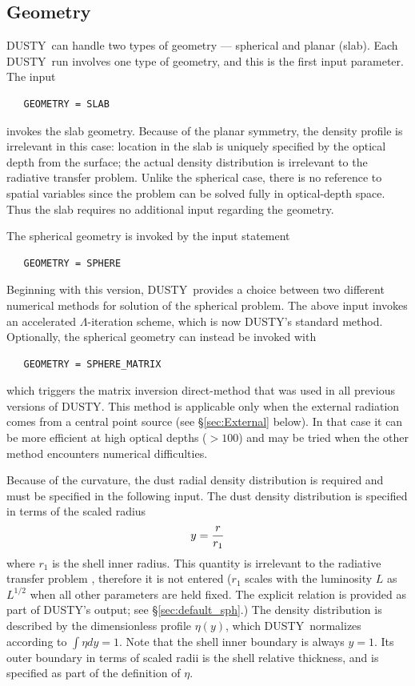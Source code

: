 \documentclass[11pt]{article}
\def\D    {{\sf DUSTY}}
\begin{document}
\subsection{Geometry}
\label{geometry}

\D\ can handle two types of geometry --- spherical and planar
(slab). Each \D\ run involves one type of geometry, and this is the
first input parameter. The input
\begin{verbatim}
   GEOMETRY = SLAB
\end{verbatim}
invokes the slab geometry. Because of the planar symmetry, the density
profile is irrelevant in this case: location in the slab is uniquely
specified by the optical depth from the surface; the actual density
distribution is irrelevant to the radiative transfer problem. Unlike
the spherical case, there is no reference to spatial variables since
the problem can be solved fully in optical-depth space. Thus the slab
requires no additional input regarding the geometry.

\medskip

The spherical geometry is invoked by the input statement
\begin{verbatim}
   GEOMETRY = SPHERE
\end{verbatim}
Beginning with this version, \D\ provides a choice between two
different numerical methods for solution of the spherical problem. The
above input invokes an accelerated $\Lambda$-iteration scheme, which
is now \D's standard method. Optionally, the spherical geometry can
instead be invoked with
\begin{verbatim}
   GEOMETRY = SPHERE_MATRIX
\end{verbatim}
which triggers the matrix inversion direct-method \cite{Schmid} that
was used in all previous versions of \D. This method is applicable
only when the external radiation comes from a central point source
(see \S\ref{sec:External} below). In that case it can be more
efficient at high optical depths ($> 100$) and may be tried when the
other method encounters numerical difficulties.

Because of the curvature, the dust radial density distribution is
required and must be specified in the following input. The dust
density distribution is specified in terms of the scaled radius
\[
y = {r \over r_1}
\]
where $r_1$ is the shell inner radius.  This quantity is irrelevant to
the radiative transfer problem \cite{IE97}, therefore it is not
entered ($r_1$ scales with the luminosity $L$ as $L^{1/2}$ when all
other parameters are held fixed. The explicit relation is provided as
part of \D's output; see \S \ref{sec:default_sph}.) The density
distribution is described by the dimensionless profile $\eta(y)$,
which \D\ normalizes according to $\int\eta dy = 1$. Note that the
shell inner boundary is always $y = 1$.  Its outer boundary in terms
of scaled radii is the shell relative thickness, and is specified as
part of the definition of $\eta$.
\end{document}
